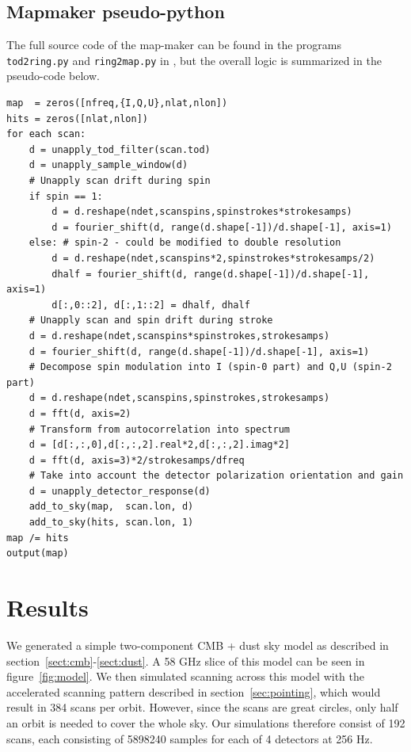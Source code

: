 \documentclass{article}
\begin{document}
\subsection{Mapmaker pseudo-python}
The full source code of the map-maker can be found in the
programs \texttt{tod2ring.py} and \texttt{ring2map.py} in
\cite{pixie_repo}, but the overall logic is summarized in
the pseudo-code below.
\begin{lstlisting}
map  = zeros([nfreq,{I,Q,U},nlat,nlon])
hits = zeros([nlat,nlon])
for each scan:
	d = unapply_tod_filter(scan.tod)
	d = unapply_sample_window(d)
	# Unapply scan drift during spin
	if spin == 1:
		d = d.reshape(ndet,scanspins,spinstrokes*strokesamps)
		d = fourier_shift(d, range(d.shape[-1])/d.shape[-1], axis=1)
	else: # spin-2 - could be modified to double resolution
		d = d.reshape(ndet,scanspins*2,spinstrokes*strokesamps/2)
		dhalf = fourier_shift(d, range(d.shape[-1])/d.shape[-1], axis=1)
		d[:,0::2], d[:,1::2] = dhalf, dhalf
	# Unapply scan and spin drift during stroke
	d = d.reshape(ndet,scanspins*spinstrokes,strokesamps)
	d = fourier_shift(d, range(d.shape[-1])/d.shape[-1], axis=1)
	# Decompose spin modulation into I (spin-0 part) and Q,U (spin-2 part)
	d = d.reshape(ndet,scanspins,spinstrokes,strokesamps)
	d = fft(d, axis=2)
	# Transform from autocorrelation into spectrum
	d = [d[:,:,0],d[:,:,2].real*2,d[:,:,2].imag*2]
	d = fft(d, axis=3)*2/strokesamps/dfreq
	# Take into account the detector polarization orientation and gain
	d = unapply_detector_response(d)
	add_to_sky(map,  scan.lon, d)
	add_to_sky(hits, scan.lon, 1)
map /= hits
output(map)
\end{lstlisting}

\section{Results}
We generated a simple two-component CMB + dust sky model as described in
section~\ref{sect:cmb}-\ref{sect:dust}. A 58 GHz slice of this
model can be seen in figure~\ref{fig:model}. We then simulated
scanning across this model with the accelerated scanning pattern
described in section~\ref{sec:pointing}, which would result in 384
scans per orbit.
However, since the scans are great circles, only half an orbit
is needed to cover the whole sky. Our simulations therefore consist
of 192 scans, each consisting of 5898240 samples for each of 4
detectors at 256 Hz.
\end{document}
